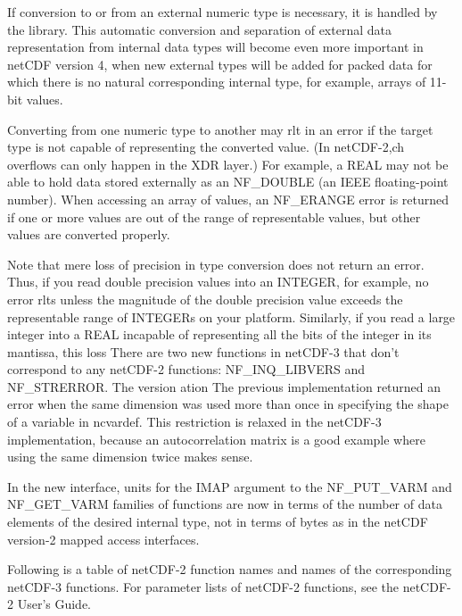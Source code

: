 If conversion to or from an external numeric type is necessary, it is handled by the library. This automatic conversion and separation of external data representation from internal data types will become even more important in net\+C\+DF version 4, when new external types will be added for packed data for which there is no natural corresponding internal type, for example, arrays of 11-\/bit values.

Converting from one numeric type to another may rlt in an error if the target type is not capable of representing the converted value. (In net\+C\+D\+F-\/2,ch overflows can only happen in the X\+DR layer.) For example, a R\+E\+AL may not be able to hold data stored externally as an N\+F\+\_\+\+D\+O\+U\+B\+LE (an I\+E\+EE floating-\/point number). When accessing an array of values, an N\+F\+\_\+\+E\+R\+A\+N\+GE error is returned if one or more values are out of the range of representable values, but other values are converted properly.

Note that mere loss of precision in type conversion does not return an error. Thus, if you read double precision values into an I\+N\+T\+E\+G\+ER, for example, no error rlts unless the magnitude of the double precision value exceeds the representable range of I\+N\+T\+E\+G\+E\+Rs on your platform. Similarly, if you read a large integer into a R\+E\+AL incapable of representing all the bits of the integer in its mantissa, this loss There are two new functions in net\+C\+D\+F-\/3 that don’t correspond to any net\+C\+D\+F-\/2 functions\+: N\+F\+\_\+\+I\+N\+Q\+\_\+\+L\+I\+B\+V\+E\+RS and N\+F\+\_\+\+S\+T\+R\+E\+R\+R\+OR. The version ation The previous implementation returned an error when the same dimension was used more than once in specifying the shape of a variable in ncvardef. This restriction is relaxed in the net\+C\+D\+F-\/3 implementation, because an autocorrelation matrix is a good example where using the same dimension twice makes sense.

In the new interface, units for the I\+M\+AP argument to the N\+F\+\_\+\+P\+U\+T\+\_\+\+V\+A\+RM and N\+F\+\_\+\+G\+E\+T\+\_\+\+V\+A\+RM families of functions are now in terms of the number of data elements of the desired internal type, not in terms of bytes as in the net\+C\+DF version-\/2 mapped access interfaces.

Following is a table of net\+C\+D\+F-\/2 function names and names of the corresponding net\+C\+D\+F-\/3 functions. For parameter lists of net\+C\+D\+F-\/2 functions, see the net\+C\+D\+F-\/2 User’s Guide.

